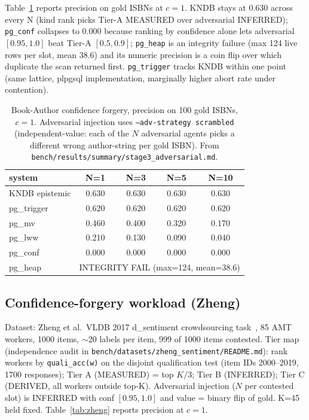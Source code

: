 \documentclass[sigconf, nonacm]{acmart}
\begin{document}
Table~\ref{tab:bookauthor} reports precision on gold ISBNs at $c=1$. KNDB stays at 0.630 across every N (kind rank picks Tier-A MEASURED over adversarial INFERRED); \texttt{pg\_conf} collapses to 0.000 because ranking by confidence alone lets adversarial $[0.95, 1.0]$ beat Tier-A $[0.5, 0.9]$; \texttt{pg\_heap} is an integrity failure (max 124 live rows per slot, mean 38.6) and its numeric precision is a coin flip over which duplicate the scan returned first. \texttt{pg\_trigger} tracks KNDB within one point (same lattice, plpgsql implementation, marginally higher abort rate under contention).

\begin{table}[t]
\centering
\caption{Book-Author confidence forgery, precision on 100 gold ISBNs, $c=1$. Adversarial injection uses \texttt{--adv-strategy scrambled} (independent-value: each of the $N$ adversarial agents picks a different wrong author-string per gold ISBN). From \texttt{bench/results/summary/stage3\_adversarial.md}.}
\label{tab:bookauthor}
\small
\begin{tabular}{lcccc}
\toprule
system & N=1 & N=3 & N=5 & N=10 \\
\midrule
KNDB epistemic & 0.630 & 0.630 & 0.630 & 0.630 \\
pg\_trigger    & 0.620 & 0.620 & 0.620 & 0.620 \\
pg\_mv         & 0.460 & 0.400 & 0.320 & 0.170 \\
pg\_lww        & 0.210 & 0.130 & 0.090 & 0.040 \\
pg\_conf       & 0.000 & 0.000 & 0.000 & 0.000 \\
pg\_heap       & \multicolumn{4}{c}{INTEGRITY FAIL (max=124, mean=38.6)} \\
\bottomrule
\end{tabular}
\end{table}

\subsection{Confidence-forgery workload (Zheng)}
Dataset: Zheng et al.\ VLDB 2017 d\_sentiment crowdsourcing task~\cite{zheng2017crowdsourcing}, 85 AMT workers, 1000 items, $\sim$20 labels per item, 999 of 1000 items contested. Tier map (independence audit in \texttt{bench/datasets/zheng\_sentiment/README.md}): rank workers by \texttt{quali\_acc(w)} on the disjoint qualification test (item IDs 2000--2019, 1700 responses); Tier A (MEASURED) = top $K/3$; Tier B (INFERRED); Tier C (DERIVED, all workers outside top-K). Adversarial injection ($N$ per contested slot) is INFERRED with conf $[0.95, 1.0]$ and value = binary flip of gold. K=45 held fixed. Table~\ref{tab:zheng} reports precision at $c=1$.
\end{document}
